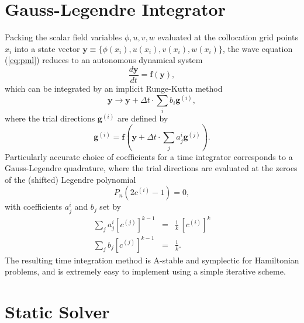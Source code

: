 \documentclass[aps,prd,reprint,twocolumn,groupedaddress]{revtex4-1}
\renewcommand{\vec}[1]{\mathbf{#1}}
\begin{document}
\section{Gauss-Legendre Integrator}

Packing the scalar field variables $\phi,u,v,w$ evaluated at the collocation grid points $x_i$ into a state vector $\vec{y} \equiv \{ \phi(x_i), u(x_i), v(x_i), w(x_i) \}$, the wave equation (\ref{eq:pml}) reduces to an autonomous dynamical system
\begin{equation}
  \frac{d\vec{y}}{dt} = \vec{f}(\vec{y}),
\end{equation}
which can be integrated by an implicit Runge-Kutta method \cite{???}
\begin{equation}
  \vec{y} \rightarrow \vec{y} + \Delta t \cdot \sum\limits_i b_i \vec{g}^{(i)},
\end{equation}
where the trial directions $\vec{g}^{(i)}$ are defined by
\begin{equation}
  \vec{g}^{(i)} = \vec{f}\left(\vec{y} + \Delta t \cdot \sum\limits_j a^i_j \vec{g}^{(j)}\right).
\end{equation}
Particularly accurate choice of coefficients for a time integrator corresponds to a Gauss-Legendre quadrature, where the trial directions are evaluated at the zeroes of the (shifted) Legendre polynomial
\begin{equation}
  P_n\left(2c^{(i)}-1\right) = 0,
\end{equation}
with coefficients $a^i_j$ and $b_j$ set by
\begin{eqnarray}
  \sum\limits_j a^i_j \left[c^{(j)}\right]^{k-1} &=& \frac{1}{k}\, \left[c^{(i)}\right]^k\\
  \sum\limits_j b_j \left[c^{(j)}\right]^{k-1} &=& \frac{1}{k}.
\end{eqnarray}
The resulting time integration method is A-stable and symplectic for Hamiltonian problems, and is extremely easy to implement using a simple iterative scheme.


\section{Static Solver}
\end{document}
